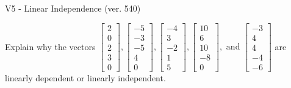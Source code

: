 \begin{exercise}
  \begin{exerciseTitle}V5 - Linear Independence (ver. 540)\end{exerciseTitle}
  \begin{exerciseStatement}
    Explain why the vectors \(\left[\begin{array}{r}
2 \\
0 \\
2 \\
3 \\
0
\end{array}\right] , \left[\begin{array}{r}
-5 \\
-3 \\
-5 \\
4 \\
0
\end{array}\right] , \left[\begin{array}{r}
-4 \\
3 \\
-2 \\
1 \\
5
\end{array}\right] , \left[\begin{array}{r}
10 \\
6 \\
10 \\
-8 \\
0
\end{array}\right] , \text{ and } \left[\begin{array}{r}
-3 \\
4 \\
4 \\
-4 \\
-6
\end{array}\right]\) are linearly dependent or linearly independent.	



\end{exerciseStatement}
\end{exercise}

